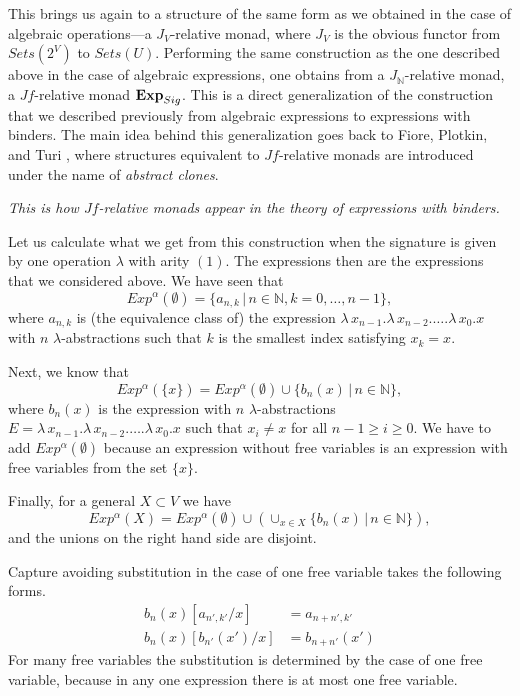 \documentclass[onecolumn,12pt]{amsart}
\numberwithin{proposition}{subsection}
\newcommand{\nn}{{\mathbb N}}
\newcommand{\nat}{\nn}
\begin{document}
This brings us again to a structure of the same form as we obtained in the case
of algebraic operations---a $J_V$-relative monad, where $J_V$ is the obvious
functor from $Sets(2^V)$ to $Sets(U)$. Performing the same construction as the
one described above in the case of algebraic expressions, one obtains from a
$J_{\nat}$-relative monad, a $Jf$-relative monad ${\bf Exp}_{Sig}$. This is a
direct generalization of the construction that we described previously from
algebraic expressions to expressions with binders. The main idea behind this
generalization goes back to Fiore, Plotkin, and Turi \cite{FPT}, where structures
equivalent to $Jf$-relative monads are introduced under the name of
{\em abstract clones}.

{\em This is how $Jf$-relative monads appear in the theory of expressions with binders.}

Let us calculate what we get from this construction when the signature is given
by one operation $\lambda$ with arity $(1)$. The expressions then are the
expressions that we considered above. We have seen that
%
$$Exp^{\alpha}(\emptyset)=\{a_{n,k}\,|\,n\in\nat,k=0,\dots,n-1\},$$
%
where $a_{n,k}$ is (the equivalence class of) the expression
$\lambda\,x_{n-1}.\lambda\,x_{n-2}.\dots.\lambda\,x_0.x$ with $n$
$\lambda$-abstractions such that $k$ is the smallest index satisfying $x_k=x$.

Next, we know that
%
$$Exp^{\alpha}(\{x\})=Exp^{\alpha}(\emptyset)\cup \{b_n(x)\,|\,n\in \nat\},$$
%
where $b_n(x)$ is the expression with $n$ $\lambda$-abstractions
$E=\lambda\,x_{n-1}.\lambda\,x_{n-2}.\dots.\lambda\,x_0.x$
such that $x_i\ne x$ for all $n-1\ge i\ge 0$. We have to add
$Exp^{\alpha}(\emptyset)$ because an expression without free variables is an
expression with free variables from the set $\{x\}$.

Finally, for a general $X\subset V$ we have
%
$$Exp^{\alpha}(X)=Exp^{\alpha}(\emptyset)\cup (\cup_{x\in X}\{b_n(x)\,|\,n\in \nat\}),$$
%
and the unions on the right hand side are disjoint. 

Capture avoiding substitution in the case of one free variable takes the following forms.
%
\begin{align}
b_n(x)[a_{n',k'}/x]&=a_{n+n',k'}\\
b_n(x)[b_{n'}(x')/x]&=b_{n+n'}(x')
\end{align}
%
For many free variables the substitution is determined by the case of one free
variable, because in any one expression there is at most one free variable.
\end{document}
